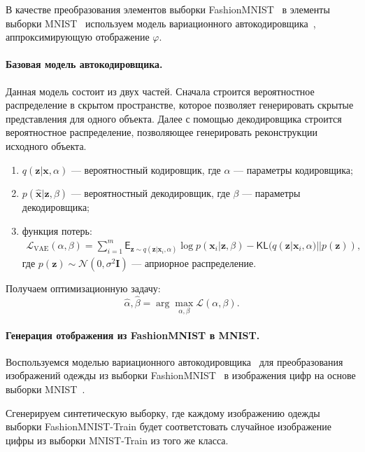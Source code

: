 В качестве преобразования элементов выборки FashionMNIST~\cite{FMNIST} в элементы выборки MNIST~\cite{MNIST} используем модель вариационного автокодировщика~\cite{VAE}, аппроксимирующую отображение $\varphi$.
\paragraph{Базовая модель автокодировщика.} Данная модель состоит из двух частей. Сначала строится вероятностное распределение в скрытом пространстве, которое позволяет генерировать скрытые представления для одного объекта. Далее с помощью декодировщика строится вероятностное распределение, позволяющее генерировать реконструкции исходного объекта.
\begin{enumerate}
    \item $q(\mathbf{z}|\mathbf{x}, \alpha)$ --- вероятностный кодировщик, где $\alpha$ --- параметры кодировщика;
    \item $p(\hat{\mathbf{x}}|\mathbf{z}, \beta)$ --- вероятностный декодировщик, где $\beta$ --- параметры декодировщика;
    \item функция потерь:
    \[
    \begin{aligned}
    \mathcal{L}_{\text{VAE}}(\alpha, \beta)=\sum\limits_{i=1}^{m}\mathsf{E}_{\mathbf{z}\sim q(\mathbf{z}|\mathbf{x}_{i}, \alpha)}\log{p(\mathbf{x}_{i}|\mathbf{z}, \beta)}-\mathsf{KL}(q(\mathbf{z}|\mathbf{x}_{i}, \alpha) || p(\mathbf{z})),
    \end{aligned}
    \]
    где
    $p(\mathbf{z})\sim \mathcal{N}(0,\sigma^{2}\mathbf{I})$ 
    --- априорное распределение.
\end{enumerate}
Получаем оптимизационную задачу:
$$\hat{\alpha}, \hat{\beta} = \arg\max_{\alpha, \beta} \mathcal{L}(\alpha, \beta).$$

\newpage
\paragraph{Генерация отображения из FashionMNIST в MNIST.}
Воспользуемся моделью вариационного автокодировщика~\cite{VAE} для преобразования изображений одежды из выборки FashionMNIST~\cite{FMNIST} в изображения цифр на основе выборки MNIST~\cite{MNIST}.

Сгенерируем синтетическую выборку, где каждому изображению одежды выборки FashionMNIST-Train будет соответстовать случайное изображение цифры из выборки MNIST-Train из того же класса.

